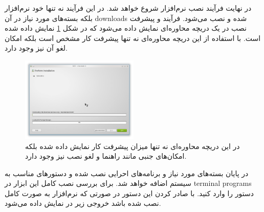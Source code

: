 در نهایت فرآیند نصب نرم‌افزار شروع خواهد شد. در این فرآیند نه تنها خود نرم‌افزار
بلکه بسته‌های مورد نیاز در آن \glspl{download} شده و نصب می‌شود. فرآیند و پیشرفت
نصب در یک دریچه محاوره‌ای نمایش داده می‌شود که در شکل
\ref{images/write/graph/mscgen/install-OpenSuse-6} نمایش داده شده است. با
استفاده از این دریچه محاوره‌ای نه تنها پیشرفت کار مشخص است بلکه امکان لغو آن نیز وجود دارد.

\begin{figure}
	\centering
	\includegraphics[width=0.5\textwidth]{images/write/graph/mscgen/install-OpenSuse-6}
	\caption[فرآیند نصب نرم‌افزار ]{
		در این دریچه محاوره‌ای نه تنها میزان پیشرفت کار نمایش داده شده بلکه امکان‌های
		جنبی مانند راهنما و لغو نصب نیز وجود دارد.
	}
	\label{images/write/graph/mscgen/install-OpenSuse-6}
\end{figure}

در پایان بسته‌های مورد نیاز و برنامه‌های احرایی نصب شده و دستورهای مناسب به
سیستم اضافه خواهد شد. برای بررسی نصب کامل این ابزار در \glspl{terminal program} دستور
 را وارد کنید. با صادر کردن این دستور در صورتی که نرم‌افزار به صورت
کامل نصب شده باشد خروجی زیر در  نمایش داده می‌شود.


